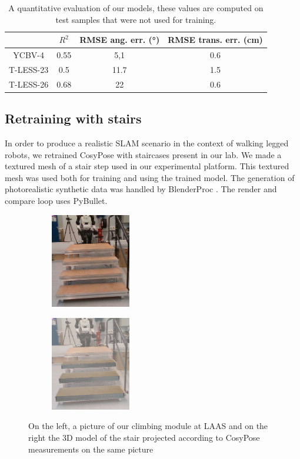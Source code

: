 \begin{table}[h]
    \centering
    \begin{tabular}{|c|c|c|c|}
        \hline 
          & $\displaystyle R^{2}$ & RMSE ang. err. (°) & RMSE trans. err. (cm) \\
        \hline 
         YCBV-4 & 0.55 & 5,1 & 0.6 \\
        \hline 
         T-LESS-23 & 0.5 & 11.7 & 1.5 \\
        \hline 
         T-LESS-26 & 0.68 & 22 & 0.6 \\
         \hline
    \end{tabular}
    \caption{A quantitative evaluation of our models, these values are computed on test samples that were not used for training. }
    \label{table:empirical_models}
\end{table}



\subsection{Retraining with stairs}
In order to produce a realistic SLAM scenario in the context of walking legged robots, we retrained CosyPose with staircases present in our lab.
We made a textured mesh of a stair step used in our experimental platform. This textured mesh was used both for training and using the trained model. 
The generation of photorealistic synthetic data was handled by BlenderProc \cite{denninger2019blenderproc}. The render and compare loop uses PyBullet\cite{coumans2021}.

\begin{figure}[t] %
    \centering
    \begin{subfigure}[]{{.49\linewidth}}
        \centering
        \includegraphics[width=3.5cm]{figures/cosyslam/0006.png} 
    \end{subfigure}
    \begin{subfigure}[]{{.49\linewidth}}
        \centering
        \includegraphics[width=3.5cm]{figures/cosyslam/0006_proj.png} 
    \end{subfigure}
    \caption{On the left, a picture of our climbing module at LAAS and on the right the 3D model of the stair projected according to CosyPose measurements on the same picture}%
    \label{fig:cosypose-ycbv}%
\end{figure}

